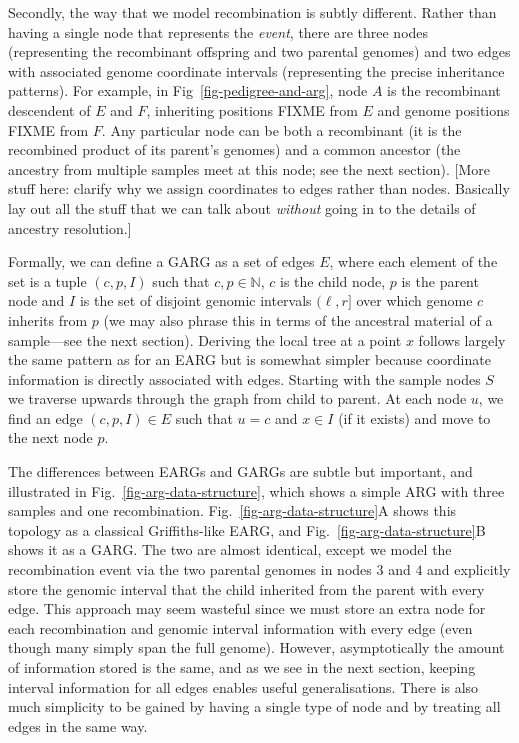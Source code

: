 \documentclass{article}
\begin{document}
Secondly, the way that we model recombination is subtly different.
Rather than having a single node that represents the \emph{event},
there are three nodes (representing the recombinant offspring and
two parental genomes) and two edges with associated genome coordinate
intervals (representing the precise inheritance patterns).
For example, in Fig~\ref{fig-pedigree-and-arg}, node $A$ is the
recombinant descendent of $E$ and $F$, inheriting positions
FIXME from $E$ and genome positions FIXME from $F$. Any particular
node can be both a recombinant (it is the recombined product of
its parent's genomes) and a common ancestor (the ancestry from
multiple samples meet at this node; see the next section).
[More stuff here: clarify why we assign coordinates to edges
rather than nodes. Basically lay out all the stuff that we can
talk about \emph{without} going in to the details of
ancestry resolution.]


Formally, we can define a GARG as a set of edges $E$, where each
element of the set is a tuple $(c, p, I)$ such that $c, p \in \mathbb{N}$,
$c$ is the child node, $p$ is the parent node and $I$ is the set of
disjoint genomic intervals $(\ell, r]$ over which genome $c$ inherits from $p$ (we may
also phrase this in terms of the ancestral material of a sample---see
the next section). Deriving the local tree at a point $x$
follows largely the same pattern as for an EARG but is somewhat
simpler because coordinate information is directly associated with
edges. Starting with the sample nodes $S$ we traverse
upwards through the graph from child to parent. At each node $u$, we find an
edge $(c, p, I) \in E$ such that $u = c$ and $x \in I$ (if it
exists) and move to the next node $p$.

The differences between EARGs
and GARGs are subtle but important, and illustrated in
Fig.~\ref{fig-arg-data-structure}, which shows a simple ARG
with three samples and one recombination.
Fig.~\ref{fig-arg-data-structure}A shows this topology as a
classical Griffiths-like EARG, and
Fig.~\ref{fig-arg-data-structure}B shows it as a GARG.
The two are almost identical, except we model the recombination
event via the two parental genomes in nodes $3$ and $4$ and explicitly
store the genomic interval that the child inherited from the
parent with every edge.
This approach may seem wasteful since we must store an extra
node for each recombination and genomic interval information
with every edge (even though many simply span the full genome).
However, asymptotically the amount of information stored is the
same, and as we see in the next section, keeping interval
information for all edges enables useful generalisations.
There is also much simplicity to be gained by having
a single type of node and by treating all edges in the same way.
\end{document}

